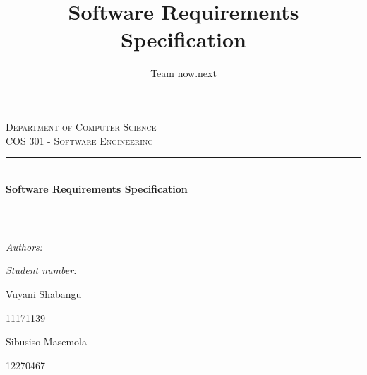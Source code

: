 \documentclass{article}
\author{Team now.next}
\title{ Software Requirements Specification}
\newcommand{\HRule}{\rule{\linewidth}{0.5mm}}
\begin{document}
	\setlength{\parskip}{6pt}
	
	\begin{titlepage}
		
		\begin{center}
			
			\textsc{\LARGE Department of Computer Science}\\[1.5cm]
			\textsc{\Large COS 301 - Software Engineering}\\[0.5cm]
			\HRule \\[0.4cm]
			{ \huge \bfseries Software Requirements Specification}\\[0.4cm]
			\HRule \\[0.4cm]
			\begin{minipage}{0.4\textwidth}
				\begin{flushleft} \large
					\emph{Authors:}
				\end{flushleft}
			\end{minipage}
			\begin{minipage}{0.4\textwidth}
				\begin{flushright} \large
					\emph{Student number:}
				\end{flushright}
			\end{minipage}
			
			\begin{minipage}{0.4\textwidth}
				\begin{flushleft} \large
					Vuyani {Shabangu}
				\end{flushleft}
			\end{minipage}
			\begin{minipage}{0.4\textwidth}
				\begin{flushright} \large
					\emph{}
					11171139
				\end{flushright}
			\end{minipage}
			
			\begin{minipage}{0.4\textwidth}
				\begin{flushleft} \large
					Sibusiso {Masemola}
				\end{flushleft}
			\end{minipage}
			\begin{minipage}{0.4\textwidth}
				\begin{flushright} \large
					\emph{}
					12270467
				\end{flushright}
			\end{minipage}
			

\end{center}
\end{titlepage}
\end{document}
